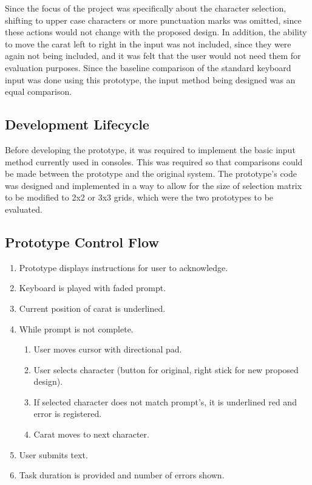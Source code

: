 \documentclass[prototype.tex]{subfiles}
\begin{document}
Since the focus of the project was specifically about the character selection,
shifting to upper case characters or more punctuation marks was omitted, since
these actions would not change with the proposed design. In addition, the
ability to move the carat left to right in the input was not included, since
they were again not being included, and it was felt that the user would not
need them for evaluation purposes. Since the baseline comparison of the standard
keyboard input was done using this prototype, the input method being designed
was an equal comparison.

\subsection{Development Lifecycle} %
\label{sub:development_lifecycle}
Before developing the prototype, it was required to implement the basic input
method currently used in consoles. This was required so that comparisons could
be made between the prototype and the original system. The prototype's code was
designed and implemented in a way to allow for the size of selection matrix to
be modified to 2x2 or 3x3 grids, which were the two prototypes to be evaluated.

\subsection{Prototype Control Flow} %
\label{sub:prototype_control_flow}
\begin{enumerate}
	\item Prototype displays instructions for user to acknowledge.
	\item Keyboard is played with faded prompt.
	\item Current position of carat is underlined.
	\item While prompt is not complete.
	\begin{enumerate}
		\item User moves cursor with directional pad.
		\item User selects character (button for original, right stick for
		new proposed design).
		\item If selected character does not match prompt's, it is underlined
		red and error is registered.
		\item Carat moves to next character.
	\end{enumerate}
	\item User submits text.
	\item Task duration is provided and number of errors shown.
\end{enumerate}
\end{document}
